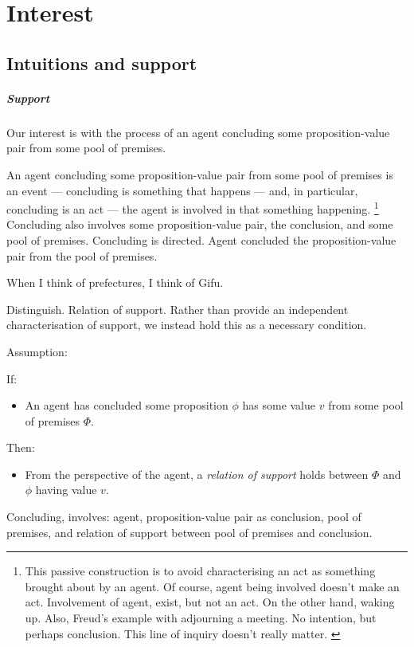 \section{Interest}
\label{overview:sec:interest}

\subsection{Intuitions and support}
\label{overview:sec:support}


\subparagraph*{Support}

\begin{note}
  Our interest is with the process of an agent concluding some proposition-value pair from some pool of premises.

  An agent concluding some proposition-value pair from some pool of premises is an event --- concluding is something that happens --- and, in particular, concluding is an act --- the agent is involved in that something happening.%
  \footnote{
    This passive construction is to avoid characterising an act as something brought about by an agent.
    Of course, agent being involved doesn't make an act.
    Involvement of agent, exist, but not an act.
    On the other hand, waking up.
    {
      \color{red}
      Also, Freud's example with adjourning a meeting.
      No intention, but perhaps conclusion.
    }
    {
      \color{red} This line of inquiry doesn't really matter.
    }
  }
  Concluding also involves some proposition-value pair, the conclusion, and some pool of premises.
  Concluding is directed.
  Agent concluded the proposition-value pair from the pool of premises.

  When I think of prefectures, I think of Gifu.

  Distinguish.
  Relation of support.
  Rather than provide an independent characterisation of support, we instead hold this as a necessary condition.

  Assumption:

  \begin{assumption}[Support]
    \label{assumption:support}
    If:
    \begin{itemize}
    \item
      An agent has concluded some proposition \(\phi\) has some value \(v\) from some pool of premises \(\Phi\).
    \end{itemize}
    Then:
    \begin{itemize}
    \item
      From the perspective of the agent, a \emph{relation of support} holds between \(\Phi\) and \(\phi\) having value \(v\).
    \end{itemize}
    \vspace{-\baselineskip}
  \end{assumption}

  Concluding, involves: agent, proposition-value pair as conclusion, pool of premises, and relation of support between pool of premises and conclusion.
\end{note}

